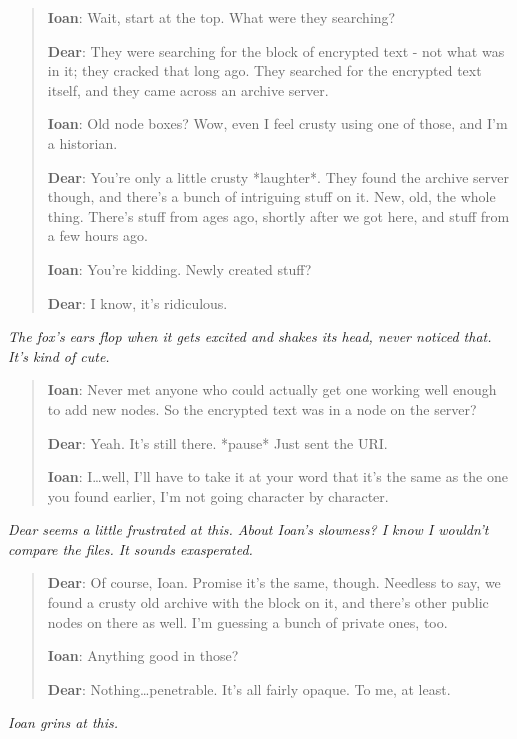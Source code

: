 \begin{quote}
\textbf{Ioan}: Wait, start at the top. What were they searching?

\textbf{Dear}: They were searching for the block of encrypted text - not what was in it; they cracked that long ago. They searched for the encrypted text itself, and they came across an archive server.

\textbf{Ioan}: Old node boxes? Wow, even I feel crusty using one of those, and I'm a historian.

\textbf{Dear}: You're only a little crusty *laughter*. They found the archive server though, and there's a bunch of intriguing stuff on it. New, old, the whole thing. There's stuff from ages ago, shortly after we got here, and stuff from a few hours ago.

\textbf{Ioan}: You're kidding. Newly created stuff?

\textbf{Dear}: I know, it's ridiculous.
\end{quote}

\emph{The fox's ears flop when it gets excited and shakes its head, never noticed that. It's kind of cute.}

\begin{quote}
\textbf{Ioan}: Never met anyone who could actually get one working well enough to add new nodes. So the encrypted text was in a node on the server?

\textbf{Dear}: Yeah. It's still there. *pause* Just sent the URI.

\textbf{Ioan}: I\ldots{}well, I'll have to take it at your word that it's the same as the one you found earlier, I'm not going character by character.
\end{quote}

\emph{Dear seems a little frustrated at this. About Ioan's slowness? I know I wouldn't compare the files. It sounds exasperated.}

\begin{quote}
\textbf{Dear}: Of course, Ioan. Promise it's the same, though. Needless to say, we found a crusty old archive with the block on it, and there's other public nodes on there as well. I'm guessing a bunch of private ones, too.

\textbf{Ioan}: Anything good in those?

\textbf{Dear}: Nothing\ldots{}penetrable. It's all fairly opaque. To me, at least.
\end{quote}

\emph{Ioan grins at this.}

